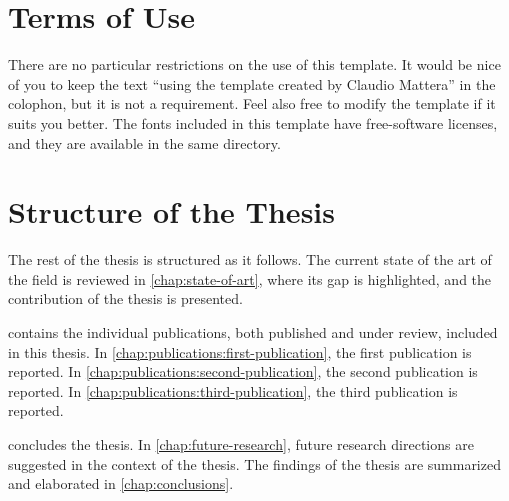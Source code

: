 \section{Terms of Use}

There are no particular restrictions on the use of this template.
It would be nice of you to keep the text \enquote{using \textelp{} the \modernthesistemplatename{} template created by Claudio Mattera} in the colophon, but it is not a requirement.
Feel also free to modify the template if it suits you better.
The fonts included in this template have free-software licenses, and they are available in the same directory.


\section{Structure of the Thesis}

The rest of the thesis is structured as it follows.
The current state of the art of the field is reviewed in \cref{chap:state-of-art}, where its gap is highlighted, and the contribution of the thesis is presented.

 contains the individual publications, both published and under review, included in this thesis.
In \cref{chap:publications:first-publication}, the first publication is reported.
In \cref{chap:publications:second-publication}, the second publication is reported.
In \cref{chap:publications:third-publication}, the third publication is reported.

 concludes the thesis.
In \cref{chap:future-research}, future research directions are suggested in the context of the thesis.
The findings of the thesis are summarized and elaborated in \cref{chap:conclusions}.
